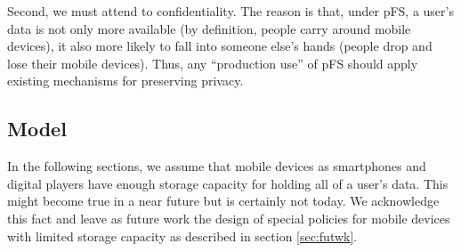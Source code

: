 Second, we must attend to confidentiality. The reason is that, under
pFS, a user's data is not only more available (by definition, people
carry around mobile devices), it also more likely to fall into someone
else's hands (people drop and lose their mobile devices). Thus, any
``production use'' of pFS should apply existing mechanisms for
preserving privacy. 

\subsection {Model}
\label{sec:model_mob}

In the following sections, we assume that mobile devices as
smartphones and digital players have enough storage capacity for
holding all of a user's data. This might become true in a near future
but is certainly not today. We acknowledge this fact and leave as
future work the design of special policies for mobile devices with
limited storage capacity as described in section \ref{sec:futwk}.

\endinput

\subsection {Existing Models}

As we are writing, new services are being introduced to the
market: they are distributed storage systems, with support for
disconnected operations. A local copy of the files is kept on every
device participating in the system. These products results in a user
experience close to what we are aiming at with pFS. Nevertheless, these
systems rely on the existence of a central server, always available,
where conflicts are detected. Figure \ref{OthModel} shows a diagram of
such existing solutions.

